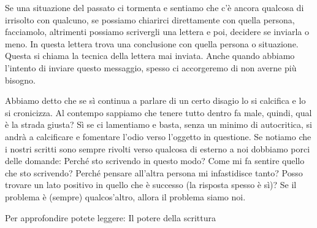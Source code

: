 \documentclass[12pt]{book} %
\begin{document}
Se una situazione del passato ci tormenta e sentiamo che c'è ancora qualcosa di irrisolto con qualcuno, se possiamo
chiarirci direttamente con quella persona, facciamolo, altrimenti possiamo scrivergli una lettera e poi, decidere se
inviarla o meno. In questa lettera trova una conclusione con quella persona o situazione.
Questa si chiama la tecnica della lettera mai inviata. Anche quando abbiamo l'intento di inviare questo messaggio, spesso ci accorgeremo di non averne più bisogno.

Abbiamo detto che se sì continua a parlare di un certo disagio lo si calcifica e lo si cronicizza. Al contempo sappiamo
che tenere tutto dentro fa male, quindi, qual è la strada giusta? Sì se ci lamentiamo e basta, senza un minimo di
autocritica, si andrà a calcificare e fomentare l'odio verso l'oggetto in questione. Se notiamo
che i nostri scritti sono sempre rivolti verso qualcosa di esterno a noi dobbiamo porci delle domande: Perché sto
scrivendo in questo modo? Come mi fa sentire quello che sto scrivendo? Perché pensare all'altra
persona mi infastidisce tanto? Posso trovare un lato positivo in quello che è successo (la risposta spesso è sì)?
Se il problema è (sempre) qualcos'altro, allora il problema siamo noi.

Per approfondire potete leggere: Il potere della
scrittura


\bigskip
\end{document}
